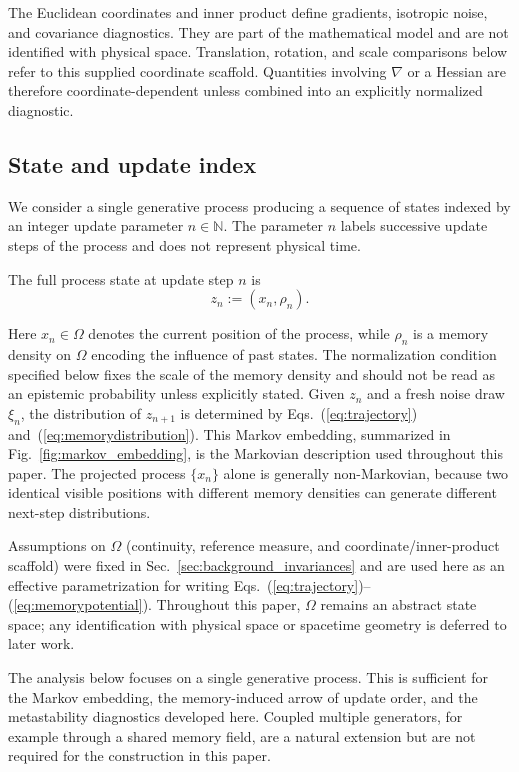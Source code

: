 \documentclass[reprint,amsmath,amssymb,aps,prd,nofootinbib,floatfix]{revtex4-2}
\begin{document}
The Euclidean coordinates and inner product define gradients, isotropic noise,
and covariance diagnostics.
They are part of the mathematical model and are not identified with physical
space.
Translation, rotation, and scale comparisons below refer to this supplied
coordinate scaffold.
Quantities involving $\nabla$ or a Hessian are therefore coordinate-dependent
unless combined into an explicitly normalized diagnostic.
\subsection{State and update index}

We consider a single generative process producing a sequence of states indexed by an integer update parameter $n\in\mathbb{N}$.
The parameter $n$ labels successive update steps of the process and does not represent physical time.

The full process state at update step $n$ is
\begin{equation} \label{eq:augmented_state}
z_n := (x_n,\rho_n).
\end{equation}

Here $x_n\in\Omega$ denotes the current position of the process, while $\rho_n$ is a memory density on $\Omega$ encoding the influence of past states.
The normalization condition specified below fixes the scale of the memory density and should not be read as an epistemic probability unless explicitly stated.
Given $z_n$ and a fresh noise draw $\xi_n$, the distribution of $z_{n+1}$ is determined by Eqs.~(\ref{eq:trajectory}) and~(\ref{eq:memorydistribution}).
This Markov embedding, summarized in Fig.~\ref{fig:markov_embedding}, is the Markovian description used throughout this paper.
The projected process $\{x_n\}$ alone is generally non-Markovian, because two identical visible positions with different memory densities can generate different next-step distributions.

Assumptions on $\Omega$ (continuity, reference measure, and coordinate/inner-product scaffold) were fixed in Sec.~\ref{sec:background_invariances} and are used here as an effective parametrization for writing Eqs.~(\ref{eq:trajectory})--(\ref{eq:memorypotential}). Throughout this paper, $\Omega$ remains an abstract state space; any identification with physical space or spacetime geometry is deferred to later work.

The analysis below focuses on a single generative process.
This is sufficient for the Markov embedding, the memory-induced arrow of update order, and the metastability diagnostics developed here.
Coupled multiple generators, for example through a shared memory field, are a natural extension but are not required for the construction in this paper.
\end{document}
